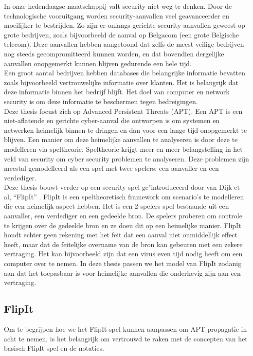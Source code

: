 \documentclass[master=cws, masteroption=vs,english]{kulemt}
\begin{document}
\begin{abstract*}
In onze hedendaagse maatschappij valt security niet weg te denken.  Door de technologische vooruitgang worden security-aanvallen veel geavanceerder en moeilijker te bestrijden. Zo zijn er onlangs gerichte security-aanvallen geweest op grote bedrijven, zoals bijvoorbeeld de aanval op Belgacom (een grote Belgische telecom). Deze aanvallen hebben aangetoond dat zelfs de meest veilige
bedrijven nog steeds gecompromitteerd kunnen worden, en dat bovendien dergelijke aanvallen onopgemerkt kunnen blijven gedurende een hele tijd. \\

Een groot aantal bedrijven hebben databases die belangrijke informatie bevatten zoals bijvoorbeeld vertrouwelijke informatie over klanten. Het is belangrijk dat deze informatie binnen het bedrijf blijft. Het doel van computer en network security is om deze informatie te beschermen tegen bedreigingen. \\
Deze thesis focust zich op Advanced Persistent Threats (APT). Een APT is een niet-aflatende en gerichte cyber-aanval die ontworpen is om systemen en netwerken heimelijk binnen te dringen en dan voor een lange tijd onopgemerkt te blijven. Een manier om deze heimelijke aanvallen te analyseren is door deze te modelleren via speltheorie. Speltheorie krijgt meer en meer belangstelling in het veld van security om cyber security problemen te analyseren. Deze problemen zijn meestal gemodelleerd als een spel met twee spelers: een aanvaller en een verdediger. \\

Deze thesis bouwt verder op een security spel ge"introduceerd door van Dijk et al, ``FlipIt'' \citep{FlipIt}.
FlipIt is een speltheoretisch framework om scenario's te modelleren die een heimelijk aspect hebben. Het is een 2-spelers spel bestaande uit een aanvaller, een verdediger en een gedeelde bron.  De spelers proberen om controle te krijgen over de gedeelde bron en ze
doen dit op een heimelijke manier. FlipIt houdt echter geen rekening met het feit dat een aanval niet onmiddellijk effect heeft, maar dat de feitelijke overname van de bron kan gebeuren met een zekere vertraging. Het kan bijvoorbeeld zijn dat een virus even tijd nodig heeft om een computer over te nemen. In deze thesis passen we het model van FlipIt zodanig aan dat het toepasbaar is voor heimelijke aanvallen die onderhevig zijn aan een vertraging.
 \\

\subsection{FlipIt}
Om te begrijpen hoe we het FlipIt spel kunnen aanpassen om APT propagatie in acht te nemen, is het belangrijk om vertrouwd te raken met de concepten van het basisch FlipIt spel en de notaties.  \\


\end{abstract*}
\end{document}
